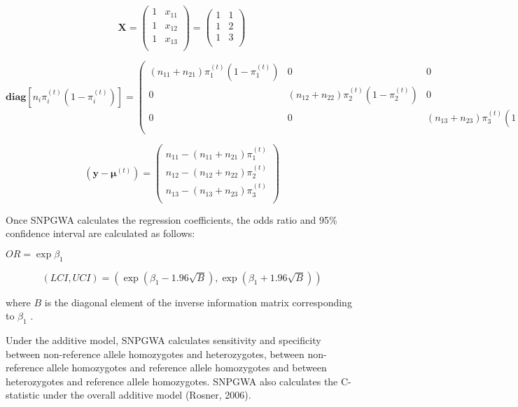 \begin{enumerate}
\begin{equation*}
  \mathbf{X} =
  \begin{pmatrix}
    1 & x_{11} \\
    1 & x_{12} \\
    1 & x_{13} \\
  \end{pmatrix}
  =
  \begin{pmatrix}
    1 & 1 \\
    1 & 2 \\
    1 & 3 \\
  \end{pmatrix}
\end{equation*}

\begin{equation*}
  \mathbf{diag}[n_i\pi_i^{(t)}(1-\pi_i^{(t)})] = 
  \begin{pmatrix}
    (n_{11}+n_{21})\pi_1^{(t)}(1-\pi_1^{(t)}) & 0 & 0 \\
    0 & (n_{12}+n_{22})\pi_2^{(t)}(1-\pi_2^{(t)}) & 0 \\
    0 & 0 & (n_{13}+n_{23})\pi_3^{(t)}(1-\pi_3^{(t)}) \\
  \end{pmatrix}
\end{equation*}

\begin{equation*}
  (\mathbf{y}-\boldsymbol{\mu}^{(t)}) = 
  \begin{pmatrix}
    n_{11} - (n_{11} + n_{21})\pi_1^{(t)} \\
    n_{12} - (n_{12} + n_{22})\pi_2^{(t)} \\
    n_{13} - (n_{13} + n_{23})\pi_3^{(t)} \\
  \end{pmatrix}
\end{equation*}

Once SNPGWA calculates the regression coefficients, the odds ratio and 95\%
confidence interval are calculated as follows:

\noindent{}$OR = \exp{\beta_1}$

\begin{equation*}
  (LCI, UCI) = \left(\exp\left(\beta_1 - 1.96\sqrt{B}\right), \exp\left(\beta_1 + 1.96\sqrt{B}\right)\right)
\end{equation*}

where $B$ is the diagonal element of the inverse information matrix
corresponding to $\beta_1$ .

Under the additive model, SNPGWA calculates sensitivity and specificity between
non-reference allele homozygotes and heterozygotes, between non-reference allele
homozygotes and reference allele homozygotes and between heterozygotes and
reference allele homozygotes.  SNPGWA also calculates the C-statistic under the
overall additive model (Rosner, 2006).


\end{enumerate}

